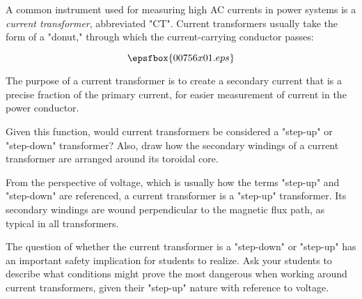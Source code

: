 

A common instrument used for measuring high AC currents in power systems is a {\it current transformer}, abbreviated "CT".  Current transformers usually take the form of a "donut," through which the current-carrying conductor passes:

$$\epsfbox{00756x01.eps}$$

The purpose of a current transformer is to create a secondary current that is a precise fraction of the primary current, for easier measurement of current in the power conductor.

Given this function, would current transformers be considered a "step-up" or "step-down" transformer?  Also, draw how the secondary windings of a current transformer are arranged around its toroidal core.







From the perspective of voltage, which is usually how the terms "step-up" and "step-down" are referenced, a current transformer is a "step-up" transformer.  Its secondary windings are wound perpendicular to the magnetic flux path, as typical in all transformers.







The question of whether the current transformer is a "step-down" or "step-up" has an important safety implication for students to realize.  Ask your students to describe what conditions might prove the most dangerous when working around current transformers, given their "step-up" nature with reference to voltage.




